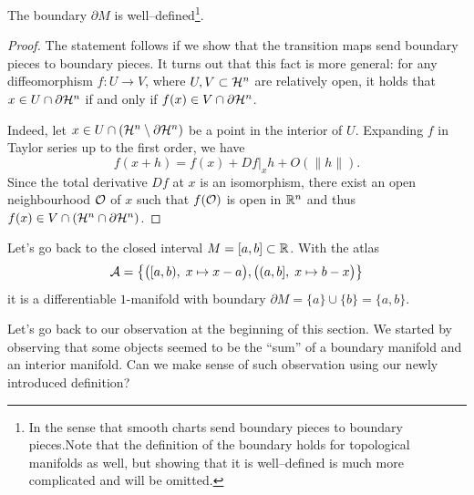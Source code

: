 \begin{proposition}\label{prop:bdwelldef}
  The boundary $\partial M$ is well--defined\footnote{In the sense that smooth charts send boundary pieces to boundary pieces.Note that the definition of the boundary holds for topological manifolds as well, but showing that it is well--defined is much more complicated and will be omitted.}.
\end{proposition}
\begin{proof}
  The statement follows if we show that the transition maps send boundary pieces to boundary pieces.
  It turns out that this fact is more general: for any diffeomorphism $f:U \to V$, where $U,V \subset\mathcal{H}^n$ are relatively open, it holds that $x\in U\cap\partial\mathcal{H}^n$ if and only if $f(x)\in V\cap\partial\mathcal{H}^n$.

  Indeed, let $x\in U\cap(\mathcal{H}^n\setminus\partial\mathcal{H}^n)$ be a point in the interior of $U$. Expanding $f$ in Taylor series up to the first order, we have
  \begin{equation}
    f(x+h) = f(x) + Df|_x h + O(\|h\|).
  \end{equation}
  Since the total derivative $D f$ at $x$ is an isomorphism, there exist an open neighbourhood $\mathcal{O}$ of $x$ such that $f(\mathcal{O})$ is open in $\mathbb{R}^n$ and thus $f(x)\in V\cap(\mathcal{H}^n\cap\partial\mathcal{H}^n)$.
\end{proof}

\begin{example}
  Let's go back to the closed interval $M=[a,b]\subset\mathbb{R}$. 
  With the atlas
  \begin{equation}
    \mathcal{A}=\big\{
      \big([a,b), \; x\mapsto x-a\big),
      \big((a,b], \; x\mapsto b-x\big)
    \big\}
  \end{equation}
  it is a differentiable $1$-manifold with boundary $\partial M = \{a\} \cup \{b\} = \{a, b\}$.
\end{example}

Let's go back to our observation at the beginning of this section.
We started by observing that some objects seemed to be the ``sum'' of a boundary manifold and an interior manifold.
Can we make sense of such observation using our newly introduced definition?

